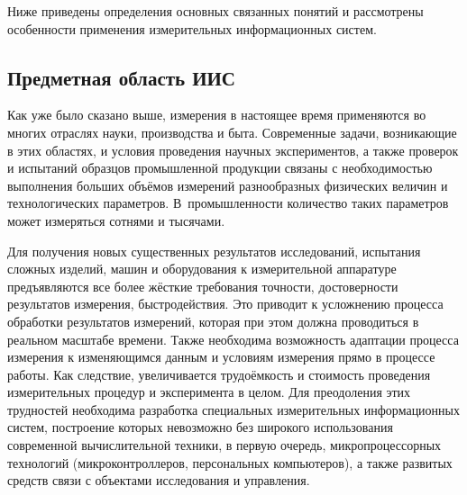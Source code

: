 \documentclass[a4paper, 14pt, titlepage]{extarticle}
\begin{document}
  Ниже приведены определения основных связанных понятий и рассмотрены особенности применения
  измерительных информационных систем.

  \subsection{Предметная область ИИС}

  Как уже было сказано выше, измерения в настоящее время применяются
  во многих отраслях науки, производства и быта. Современные задачи, возникающие в этих областях,
  и условия проведения научных экспериментов, а также проверок и испытаний образцов промышленной
  продукции связаны с необходимостью выполнения
  больших объёмов измерений разнообразных физических величин и технологических параметров.
  В~промышленности количество таких параметров может измеряться сотнями и тысячами.

  Для получения новых существенных результатов исследований, испытания сложных изделий, машин и
  оборудования к измерительной аппаратуре предъявляются все более жёсткие требования
  точности, достоверности результатов измерения, быстродействия. Это приводит к усложнению
  процесса обработки результатов измерений, которая при этом должна проводиться в реальном масштабе
  времени. Также необходима возможность адаптации процесса измерения к изменяющимся данным и условиям
  измерения прямо в процессе работы. Как следствие, увеличивается трудоёмкость и стоимость
  проведения измерительных процедур и эксперимента в целом. Для преодоления этих трудностей
  необходима разработка специальных измерительных информационных систем, построение которых
  невозможно без широкого использования современной вычислительной техники, в первую очередь,
  микропроцессорных технологий (микроконтроллеров, персональных компьютеров), а также развитых
  средств связи с объектами исследования и управления.
\end{document}
